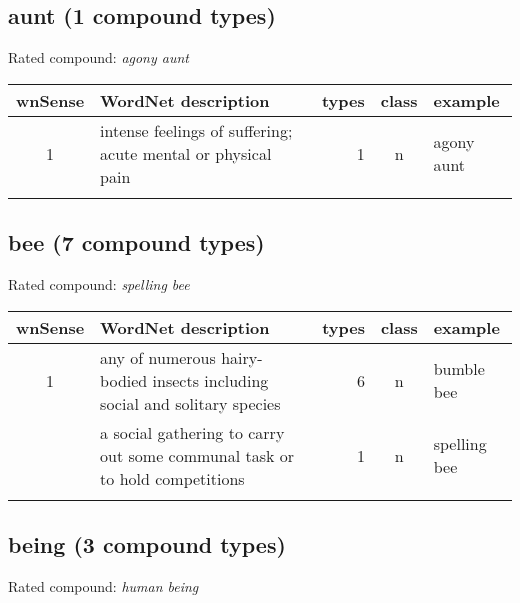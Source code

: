 

\subsection{aunt      (1 compound types)}
Rated compound: \emph{agony aunt}

\vspace*{1ex}

\noindent
\begin{longtable}{c>{\raggedright\arraybackslash}p{5cm}rc>{\raggedright\arraybackslash}p{2cm}}\lsptoprule
{\small wnSense}&WordNet description&types&class&example\\\midrule
1&intense feelings of suffering; acute mental or physical pain&1&n&agony aunt\\\lspbottomrule
\end{longtable}
\subsection{bee       (7 compound types)}
Rated compound: \emph{spelling bee}


\noindent
\begin{longtable}{c>{\raggedright\arraybackslash}p{5cm}rc>{\raggedright\arraybackslash}p{2cm}}\lsptoprule
{\small wnSense}&WordNet description&types&class&example\\\midrule
1&any of numerous hairy-bodied insects including social and solitary species&6&n&bumble bee\\\tablevspace
2&a social gathering to carry out some communal task or to hold competitions&1&n&spelling bee\\\lspbottomrule
\end{longtable}
\subsection{being     (3 compound types)}
Rated compound: \emph{human being}

\vspace*{1ex}

